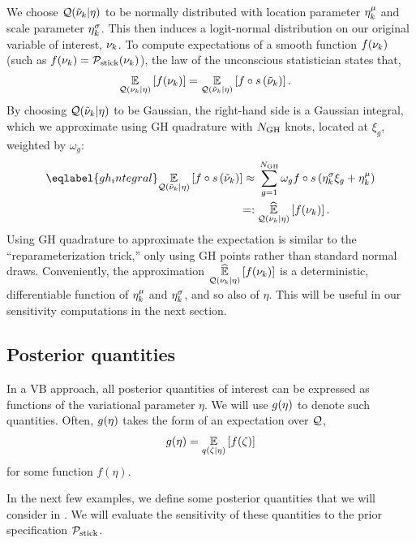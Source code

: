 We choose $\mathcal{Q}(\tilde{\nu}_k \vert \eta)$ to be normally distributed with
location parameter $\eta^{\mu}_k$ and scale parameter $\eta^{\sigma}_k$.
This then induces a logit-normal
distribution on our original variable of interest, $\nu_{k}$.
To compute expectations of a smooth function
$f(\nu_{k})$ (such as $f(\nu_{k}) = \mathcal{P}_{\mathrm{stick}}(\nu_{k})$),
the law of the unconscious statistician states that,
\begin{align*}
  \underset{\mathcal{Q}(\nu_{k} \vert \eta)}{\mathbb{E}}\left[f(\nu_{k})\right] ={}&
  \underset{\mathcal{Q}(\tilde{\nu}_k \vert \eta)}{\mathbb{E}}\left[f\circ s\left(\tilde{\nu}_k\right)\right].
\end{align*}
By choosing $\mathcal{Q}(\tilde{\nu}_k \vert \eta)$ to be Gaussian,
the right-hand side is a Gaussian integral,
which we approximate
using GH quadrature with $N_{\mathrm{GH}}$ knots,
located at $\xi_g$, weighted by $\omega_g$:
%
\begin{align}\eqlabel{gh_integral}
%
\expect{\q(\lnu_\k \vert \eta)}
       {f\circ \s\left(\lnu_\k\right)}
\approx{}&
    \sum_{g=1}^{\ngh} \omega_g f\circ \s \left(\lnusd_\k \xi_{g} + \lnumean_\k\right)
 \nonumber\\=:{}&
\expecthat{\q(\nuk \vert \eta)}{f(\nuk)}.
%
\end{align}
%
Using GH quadrature to approximate the expectation
is similar to the ``reparameterization trick,'' only using
GH points rather than standard normal draws.
Conveniently, the approximation $\underset{\mathcal{Q}(\nu_{k} \vert \eta)}{\widehat{\mathbb{E}}}\left[f(\nu_{k})\right]$
is a deterministic, differentiable
function of $\eta^{\mu}_k$ and $\eta^{\sigma}_k$, and so also of $\eta$.
This will be useful in our sensitivity computations in the next section.


\subsection{Posterior quantities}

In a VB approach, all posterior quantities of interest can be expressed as
functions of the variational parameter $\eta$. We will use $g(\eta)$ to denote
such quantities. Often, $g(\eta)$ takes the form of an expectation over $\mathcal{Q}$,
\begin{align*}
  g(\eta) = \underset{q(\zeta\vert\eta)}{\mathbb{E}}\left[f(\zeta)\right]
\end{align*}
for some function $f(\eta)$.

In the next few examples, we define some posterior quantities that we will
consider in . We will evaluate the sensitivity
of these quantities to the prior specification $\mathcal{P}_{\mathrm{stick}}$.

